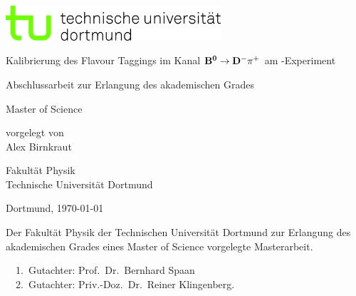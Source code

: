 
\begin{titlepage}
\includegraphics[width=8cm]{tud_logo_cmyk.jpg}
\vspace*{15ex}
{%
\Huge \sffamily \bfseries 
\begin{center}
Kalibrierung des Flavour Taggings im Kanal $\mathbf{{{B}^0}\rightarrow{\ensuremath{{D}^-}}{\ensuremath{{\pi}^+}}}$ am \lhcb-Experiment
\end{center} 
}%

\begin{otherlanguage}{german}
{%
\LARGE \sffamily %
\begin{center}
Abschlussarbeit zur Erlangung des akademischen Grades\\
\end{center}
}

{%
\LARGE \sffamily %
\begin{center}
Master of Science
\end{center}
}

\vspace{5ex}


{%
\Large \sffamily
\begin{center}
vorgelegt von \\[0.8ex]
Alex Birnkraut 
\end{center}
}
\vspace{5ex}
{%
\Large \sffamily
\begin{center}
Fakultät Physik\\
Technische Universität Dortmund
\end{center}
}
\vspace{4ex}
{%
\Large \sffamily
\begin{center}
Dortmund, \today
\end{center}
}

\clearpage
\thispagestyle{empty}
\vspace*{\fill}
\noindent Der Fakultät Physik der Technischen Universität Dortmund zur Erlangung
des akademischen Grades eines Master of Science vorgelegte
Masterarbeit.\\

\parbox{\textwidth}{
  1.~Gutachter: Prof.~Dr.~Bernhard Spaan \\
  2.~Gutachter: Priv.-Doz.~Dr.~Reiner Klingenberg.\\
}
\end{otherlanguage}
\end{titlepage}
\setcounter{page}{1}